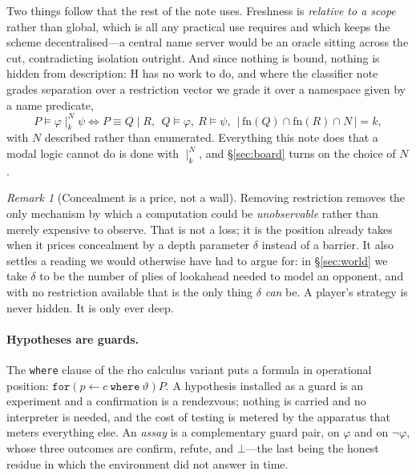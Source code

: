 \documentclass[11pt]{article}
\theoremstyle{definition}
\theoremstyle{plain}
\theoremstyle{remark}
\newtheorem{remark}[definition]{Remark}
\newcommand{\rh}{\textsf{rho}}
\newcommand{\Hq}{\mathrm{H}}
\begin{document}
Two things follow that the rest of the note uses. Freshness is
\emph{relative to a scope} rather than global, which is all any practical use
requires and which keeps the scheme decentralised---a central name server would
be an oracle sitting across the cut, contradicting isolation outright. And since
nothing is bound, nothing is hidden from description: $\Hq$ has no work to do,
and where the classifier note grades separation over a restriction vector we
grade it over a namespace given by a name predicate,
\[
P \models \varphi \mid_k^{N} \psi \iff P \equiv Q\mid R,\ \ Q \models \varphi,\
R \models \psi,\ \ |\,\mathrm{fn}(Q)\cap \mathrm{fn}(R) \cap N\,| = k ,
\]
with $N$ described rather than enumerated. Everything this note does that a
modal logic cannot do is done with $\mid_k^N$, and \S\ref{sec:board} turns on
the choice of $N$.

\begin{remark}[Concealment is a price, not a wall]
Removing restriction removes the only mechanism by which a computation could be
\emph{unobservable} rather than merely expensive to observe. That is not a loss;
it is the position \cite{scientist} already takes when it prices concealment by
a depth parameter $\delta$ instead of a barrier. It also settles a reading we
would otherwise have had to argue for: in \S\ref{sec:world} we take $\delta$ to
be the number of plies of lookahead needed to model an opponent, and with no
restriction available that is the only thing $\delta$ \emph{can} be. A player's
strategy is never hidden. It is only ever deep.
\end{remark}

\paragraph{Hypotheses are guards.} The \texttt{where} clause of the \rh{}
calculus variant \cite{gslt} puts a formula in operational position:
$\texttt{for}(p \leftarrow c \ \texttt{where}\ \vartheta)P$. A hypothesis
installed as a guard is an experiment and a confirmation is a rendezvous;
nothing is carried and no interpreter is needed, and the cost of testing is
metered by the apparatus that meters everything else. An \emph{assay} is a
complementary guard pair, on $\varphi$ and on $\neg\varphi$, whose three
outcomes are \textsf{confirm}, \textsf{refute}, and $\bot$---the last being the
honest residue in which the environment did not answer in time.
\end{document}
